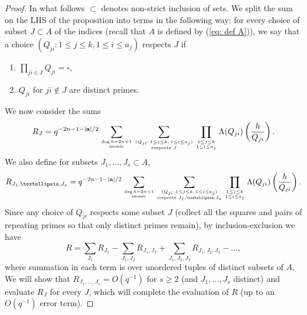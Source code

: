 \documentclass[10pt,a4paper]{amsart}
\begin{document}
\begin{proof} In what follows $\subset$ denotes non-strict inclusion of sets. We split the sum on the LHS of the proposition into terms in the following way: for every choice of subset $J\subset A$ of the indices (recall that $A$ is defined by (\ref{eq: def A})), we say that a choice $(Q_{ji}:1\le j\le k,1\le i\le a_j)$ respects $J$ if
\begin{enumerate}
    \item[(i)] $\prod_{ji\in J}Q_{ji}=\square$,
    \item[(ii)] $Q_{ji}$ for $ji\notin J$ are distinct primes.
\end{enumerate} We now consider the sums 
$$
R_J=q^{-2n-1-|\mathbf a|/2}
\sum_{\deg h=2n+1\atop{\mathrm{monic}}}
\sum_
{(Q_{ji}:\,1\le j\le k,\,1\le i\le a_j)\atop{\text{respects } J}
}
\prod_{1\le j\le k\atop{1\le i\le a_j}}\Lambda(Q_{ji})\left(\frac{h}{Q_{ji}}\right).
$$
We also define for subsets $J_1,\ldots,J_s\subset A$,
$$
R_{J_1,\ldots,J_s}=q^{-2n-1-|\mathbf a|/2}
\sum_{\deg h=2n+1\atop{\mathrm{monic}}}
\sum_
{(Q_{ji}:\,1\le j\le k,\,1\le i\le a_j)\atop{\text{respects } J_1,\ldots,J_s}
}
\prod_{1\le j\le k\atop{1\le i\le a_j}}\Lambda(Q_{ji})\left(\frac{h}{Q_{ji}}\right).
$$
Since any choice of $Q_{ji}$ respects some subset $J$ (collect all the squares and pairs of repeating primes so that only distinct primes remain), by inclusion-exclusion we have 
\begin{equation}\label{eq: inclusion-exclusion}
R =\sum_{J_1}R_{J_1}-\sum_{J_1,J_2}R_{J_1,J_2}+\sum_{J_1,J_2,J_3}R_{J_1,J_2,J_3}-\ldots,
\end{equation}
where summation in each term is over unordered tuples of distinct subsets of $A$.
We will show that $R_{J_1,\ldots,J_s}=O(q^{-1})$ for $s\ge 2$ (and $J_1,\ldots,J_s$ distinct) and evaluate $R_J$ for every $J$, which will complete the evaluation of $R$ (up to an $O(q^{-1})$ error term).



\end{proof}
\end{document}
